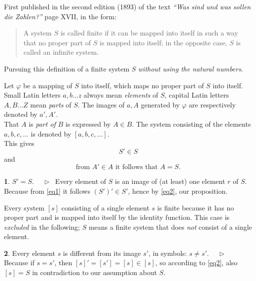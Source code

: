 \documentclass[leqno,hidelinks,a4paper]{article}
\theoremstyle{definition}
\newtheorem{sat}{\protect\satname}
\newcommand{\satname}{}
\renewcommand{\satname}{\hspace{-4pt}. Satz}%
\renewcommand{\satname}{\hspace{-4pt}. Theorem}%
\newcommand\Beweis{\newline $ \phantom{'.'} \rhd \ $}%
\newcommand{\partof}{\in}
\begin{document}
\begin{paracol}{2}

\switchcolumn
{}

\noindent First published in the second edition (1893) of the text
\textit{``Was sind und was sollen die Zahlen?''} page XVII, in the form:%

\begin{quote}
A system $S$ is called finite if it can be mapped into itself in such a way that
no proper part of $S$ is mapped into itself; in the opposite case, $S$ is called
an infinite system.
\end{quote}

Pursuing this definition of a finite system $S$ \emph{without using the natural numbers}.

Let $\varphi$ be a mapping of $S$ into itself, which maps no proper part of $S$
into itself. Small Latin letters $a, b \ldots z$ always mean \emph{elements} of
$S$, capital Latin letters $A, B \ldots Z$ mean \emph{parts} of $S$. The images
of $a, A$ generated by $\varphi$ are respectively denoted by $a', A'$.
\ \\

That $A$ is \emph{part of} $B$ is expressed by $A \partof B$. The system consisting
of the elements $a, b, c, \ldots$ is denoted by $[a, b, c, \ldots]$.
\ \\

This gives
\begin{equation}\label{eq1}
				S' \partof S
\end{equation}
and %
\begin{equation}\label{eq2}
		\text{from } A' \partof A \text{ it follows that } A = S.
\end{equation}


\begin{sat}\label{thm1}$S' = S$.
\Beweis
Every element of $S$ is an image of (at least) one element $r$ of $S$. Because
from \eqref{eq1} it follows $(S')' \partof S'$, hence by \eqref{eq2}, our proposition.
\end{sat}
Every system $[s]$ consisting of a single element $s$ is finite because it has
no proper part and is mapped into itself by the identity function. This case is
\emph{excluded} in the following; $S$ means a finite system that does \emph{not}
consist of a single element.
\smallskip

\begin{sat}\label{thm2}
Every element $s$ is different from its image $s'$, in symbols: $s \neq s'$.
\Beweis
Because if $s = s'$, then $[s]' = [s'] = [s] \partof [s]$, so according to
\eqref{eq2}, also $[s] = S$ in contradiction to our assumption about $S$.
\end{sat}


\end{paracol}
\end{document}

